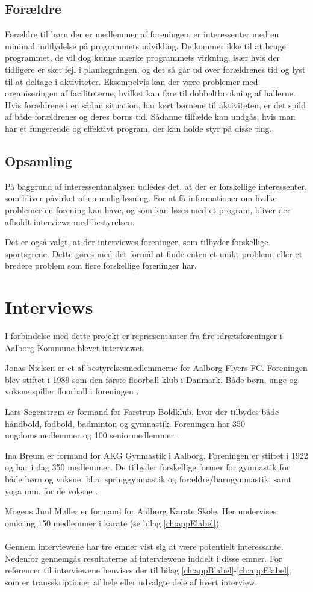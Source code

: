 \subsection*{Forældre}
Forældre til børn der er medlemmer af foreningen, er interessenter med en minimal indflydelse på programmets udvikling. De kommer ikke til at bruge programmet, de vil dog kunne mærke programmets virkning, især hvis der tidligere er sket fejl i planlægningen, og det så går ud over forældrenes tid og lyst til at deltage i aktiviteter. Eksempelvis kan der være problemer med organiseringen af faciliteterne, hvilket kan føre til dobbeltbookning af hallerne. Hvis forældrene i en sådan situation, har kørt børnene til aktiviteten, er det spild af både forældrenes og deres børns tid. Sådanne tilfælde kan undgås, hvis man har et fungerende og effektivt program, der kan holde styr på disse ting.

\subsection*{Opsamling}
På baggrund af interessentanalysen udledes det, at der er forskellige interessenter, som bliver påvirket af en mulig løsning. For at få informationer om hvilke problemer en forening kan have, og som kan løses med et program, bliver der afholdt interviews med bestyrelsen. 
\par
Det er også valgt, at der interviewes foreninger, som tilbyder forskellige sportsgrene. Dette gøres med det formål at finde enten et unikt problem, eller et bredere problem som flere forskellige foreninger har.
\clearpage
\section{Interviews}\label{Interviews}
I forbindelse med dette projekt er repræsentanter fra fire idrætsforeninger i Aalborg Kommune blevet interviewet. 
\par
Jonas Nielsen er et af bestyrelsesmedlemmerne for Aalborg Flyers FC. Foreningen blev stiftet i 1989 som den første floorball-klub i Danmark. Både børn, unge og voksne spiller floorball i foreningen \citep{AalborgFlyers}.
\par
Lars Segerstrøm er formand for Farstrup Boldklub, hvor der tilbydes både håndbold, fodbold, badminton og gymnastik. Foreningen har 350 ungdomsmedlemmer og 100 seniormedlemmer \citep{Farstrup}.
\par
Ina Breum er formand for AKG Gynmastik i Aalborg. Foreningen er stiftet i 1922 og har i dag 350 medlemmer. De tilbyder forskellige former for gymnastik for både børn og voksne, bl.a. springgymnastik og forældre/barngynmastik, samt yoga mm. for de voksne \citep{AKG}.
\par
Mogens Juul Møller er formand for Aalborg Karate Skole. Her undervises omkring 150 medlemmer i karate (se bilag \ref{ch:appElabel}).
\\\\
Gennem interviewene har tre emner vist sig at være potentielt interessante. Nedenfor gennemgås resultaterne af interviewene inddelt i disse emner. For referencer til interviewene henvises der til bilag \ref{ch:appBlabel}-\ref{ch:appElabel}, som er transskriptioner af hele eller udvalgte dele af hvert interview.

